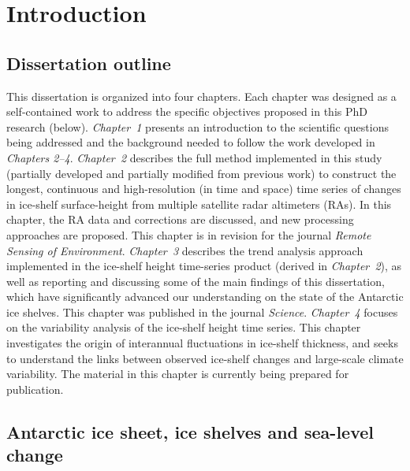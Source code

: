 


\chapter{Introduction}

\section{Dissertation outline}

\noindent
This dissertation is organized into four chapters. Each chapter was designed as a self-contained work to address the specific objectives proposed in this PhD research (below). {\sl Chapter~1} presents an introduction to the scientific questions being addressed and the background needed to follow the work developed in {\sl Chapters 2--4}. {\sl Chapter~2} describes the full method implemented in this study (partially developed and partially modified from previous work) to construct the longest, continuous and high-resolution (in time and space) time series of changes in ice-shelf surface-height from multiple satellite radar altimeters (RAs). In this chapter, the RA data and corrections are discussed, and new processing approaches are proposed. This chapter is in revision for the journal {\it Remote Sensing of Environment}. {\sl Chapter~3} describes the trend analysis approach implemented in the ice-shelf height time-series product (derived in {\sl Chapter~2}), as well as reporting and discussing some of the main findings of this dissertation, which have significantly advanced our understanding on the state of the Antarctic ice shelves. This chapter was published in the journal {\it Science}. {\sl Chapter~4} focuses on the variability analysis of the ice-shelf height time series. This chapter investigates the origin of interannual fluctuations in ice-shelf thickness, and seeks to understand the links between observed ice-shelf changes and large-scale climate variability. The material in this chapter is currently being prepared for publication.


\section{Antarctic ice sheet, ice shelves and sea-level change}

